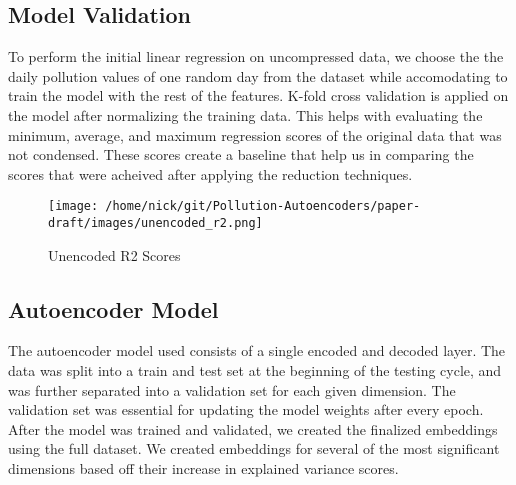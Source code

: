 \documentclass{article}
\begin{document}
\subsection{Model Validation}

\par To perform the initial linear regression on uncompressed data, we choose the the daily pollution values of one random day from the dataset while accomodating to train the model with the rest of the features. K-fold cross validation is applied on the model after normalizing the training data. This helps with evaluating the minimum, average, and maximum regression scores of the original data that was not condensed. These scores create a baseline that help us in comparing the scores that were acheived after applying the reduction techniques.

\begin{figure}[h!]
    \centering
    \caption{Unencoded R2 Scores}
    \label{fig:pipeline}
    \texttt{[image: /home/nick/git/Pollution-Autoencoders/paper-draft/images/unencoded\_r2.png]}
\end{figure}

\subsection{Autoencoder Model}

\par The autoencoder model used consists of a single encoded and decoded layer. The data was split into a train and test set at the beginning of the testing cycle, and was further separated into a validation set for each given dimension. The validation set was essential for updating the model weights after every epoch. After the model was trained and validated, we created the finalized embeddings using the full dataset. We created embeddings for several of the most significant dimensions based off their increase in explained variance scores.
\end{document}
